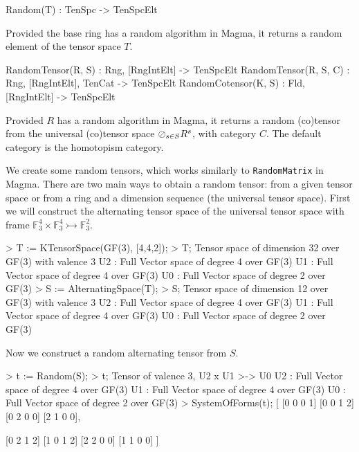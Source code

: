 \begin{intrinsics}
Random(T) : TenSpc -> TenSpcElt
\end{intrinsics}

Provided the base ring has a random algorithm in Magma, it returns a random 
element of the tensor space $T$.

\begin{intrinsics}
RandomTensor(R, S) : Rng, [RngIntElt] -> TenSpcElt
RandomTensor(R, S, C) : Rng, [RngIntElt], TenCat -> TenSpcElt
RandomCotensor(K, S) : Fld, [RngIntElt] -> TenSpcElt
\end{intrinsics}

Provided $R$ has a random algorithm in Magma, it returns a random (co)tensor from 
the universal (co)tensor space $\oslash_{s\in S} R^{s}$, with category $C$.
The default category is the homotopism category.

\begin{example}[RandomTensors]

We create some random tensors, which works similarly to \texttt{RandomMatrix} in Magma.
There are two main ways to obtain a random tensor: from a given tensor space or from a ring and a dimension sequence (the universal tensor space). 
First we will construct the alternating tensor space of the universal tensor space with frame $\mathbb{F}_3^4\times\mathbb{F}_3^4\rightarrowtail \mathbb{F}_3^2$.
\begin{code}
> T := KTensorSpace(GF(3), [4,4,2]);
> T;
Tensor space of dimension 32 over GF(3) with valence 3
U2 : Full Vector space of degree 4 over GF(3)
U1 : Full Vector space of degree 4 over GF(3)
U0 : Full Vector space of degree 2 over GF(3)
> S := AlternatingSpace(T);
> S;
Tensor space of dimension 12 over GF(3) with valence 3
U2 : Full Vector space of degree 4 over GF(3)
U1 : Full Vector space of degree 4 over GF(3)
U0 : Full Vector space of degree 2 over GF(3)
\end{code}

Now we construct a random alternating tensor from $S$.
\begin{code}
> t := Random(S);
> t;
Tensor of valence 3, U2 x U1 >-> U0
U2 : Full Vector space of degree 4 over GF(3)
U1 : Full Vector space of degree 4 over GF(3)
U0 : Full Vector space of degree 2 over GF(3)
> SystemOfForms(t);
[
    [0 0 0 1]
    [0 0 1 2]
    [0 2 0 0]
    [2 1 0 0],

    [0 2 1 2]
    [1 0 1 2]
    [2 2 0 0]
    [1 1 0 0]
]
\end{code}
\end{example}


